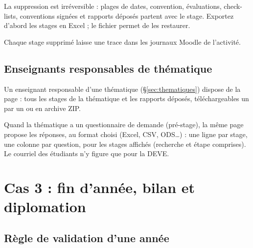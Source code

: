 \documentclass[11pt,a4paper]{article}
\begin{document}

\begin{attention}
La suppression est irréversible : plages de dates, convention, évaluations,
check-lists, conventions signées et rapports déposés partent avec le stage.
Exportez d'abord les stages en Excel ; le fichier permet de les restaurer.
\end{attention}

Chaque stage supprimé laisse une trace dans les journaux Moodle de l'activité.

\subsection{Enseignants responsables de thématique}
\label{sec:themeteachers}

Un enseignant responsable d'une thématique (§\ref{sec:thematiques}) dispose de
la page  : tous les stages de la thématique et les
rapports déposés, téléchargeables un par un ou en archive ZIP.


Quand la thématique a un questionnaire de demande (pré-stage), la même page
propose  les réponses, au format choisi (Excel, CSV,
ODS\ldots) : une ligne par stage, une colonne par question, pour les stages
affichés (recherche et étape comprises). Le courriel des étudiants n'y figure
que pour la DEVE.


\section{Cas 3 : fin d'année, bilan et diplomation}
\label{sec:cas3}

\subsection{Règle de validation d'une année}
\end{document}
